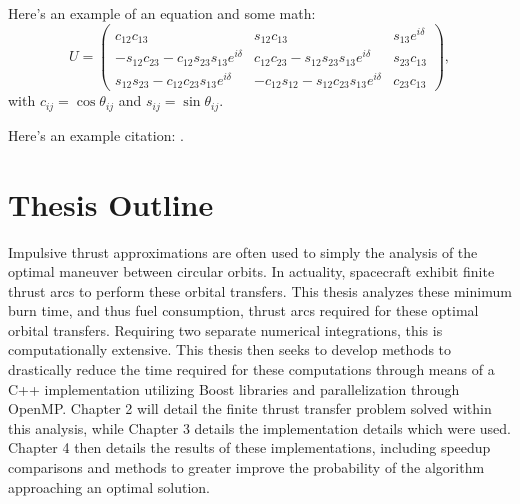 Here's an example of an equation and some math:
\begin{equation}
  U = \begin{pmatrix} c_{12}c_{13} & s_{12}c_{13} & s_{13}e^{i\delta}\\
    -s_{12}c_{23} - c_{12}s_{23}s_{13}e^{i\delta} & c_{12}c_{23} - s_{12}s_{23}s_{13}e^{i\delta} & s_{23}c_{13}\\
    s_{12}s_{23} - c_{12}c_{23}s_{13}e^{i\delta} & -c_{12}s_{12} - s_{12}c_{23}s_{13}e^{i\delta} & c_{23}c_{13}
  \end{pmatrix},
\end{equation}
with $c_{ij} = \cos{\theta_{ij}}$ and $s_{ij} = \sin{\theta_{ij}}$.

Here's an example citation: \citep{PDG}.

\section{Thesis Outline}

Impulsive thrust approximations are often used to simply the analysis of the optimal maneuver between circular orbits.
 In actuality, spacecraft exhibit finite thrust arcs to perform these orbital transfers. This thesis analyzes these minimum burn time, and thus fuel consumption,
 thrust arcs required for these optimal orbital transfers. Requiring two separate numerical integrations, this is computationally extensive. This thesis
 then seeks to develop methods to drastically reduce the time required for these computations through means of a C++ implementation utilizing Boost libraries and
 parallelization through OpenMP. Chapter 2 will detail the finite thrust transfer problem solved within this analysis, while Chapter 3 details the implementation details which were used.
 Chapter 4 then details the results of these implementations, including speedup comparisons and methods to greater improve the probability of the algorithm approaching an optimal solution.
